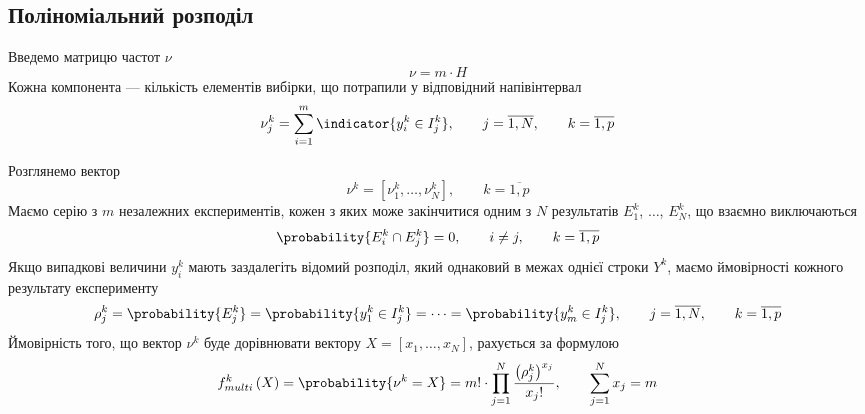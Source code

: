 \subsection{Поліноміальний розподіл}
Введемо матрицю частот $\nu$
\begin{equation*}
  \nu = m \cdot H
\end{equation*}
Кожна компонента --- кількість елементів вибірки, що потрапили у відповідний
напівінтервал
\begin{equation*}
  \nu_j^k = \sum_{i=1}^{m} \indicator{y_i^k \in I_j^k},
  \qquad j = \overline{1, N},
  \qquad k = \overline{1, p}
\end{equation*}

Розглянемо вектор
\begin{equation}\label{eq:vector:multinomial}
  \nu^k = \left[ \nu_1^k, \dots, \nu_N^k \right],
  \qquad k = \overline{1,p}
\end{equation}
Маємо серію з $m$ незалежних експериментів, кожен з яких може закінчитися
одним з $N$ результатів $E_1^k$, $\dots$, $E_N^k$, що взаємно виключаються
\begin{equation*}
  \probability{E_i^k \cap E_j^k} = 0,
  \qquad i \neq j,
  \qquad k = \overline{1,p}
\end{equation*}
Якщо випадкові величини $y_i^k$ мають заздалегіть відомий
розподіл, який однаковий в межах однієї строки $Y^k$, маємо ймовірності
кожного результату експерименту
\begin{equation*}
  \rho_j^k = \probability{E_j^k} = \probability{y_1^k \in I_j^k}
  = \dots = \probability{y_m^k \in I_j^k},
  \qquad j = \overline{1,N},
  \qquad k = \overline{1,p}
\end{equation*}
Ймовірність того, що вектор $\nu^k$ буде дорівнювати вектору
$X = \left[ x_1, \dots, x_N \right]$, рахується за формулою
\begin{equation*}
  f_{multi}^k\left( X \right)
  = \probability{\nu^k = X}
  = m! \cdot \prod_{j=1}^N \frac{\left( \rho_j^k \right)^{x_j}}{x_j!},
  \qquad \sum_{j=1}^{N}x_j = m
\end{equation*}

